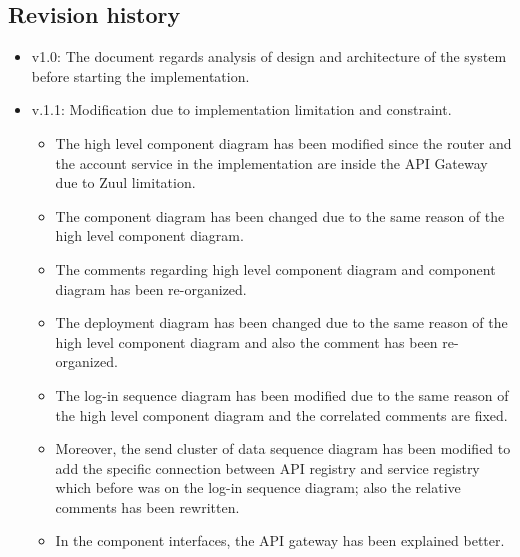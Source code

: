 \subsection{Revision history}
\begin{itemize}
\item v1.0: The document regards analysis of design and architecture of the system before starting the implementation.
\item v.1.1: Modification due to implementation limitation and constraint.
\begin{itemize}
	\item The high level component diagram has been modified since the router and the account service in the implementation are inside the API Gateway due to Zuul limitation.
	\item The component diagram has been changed due to the same reason of the high level component diagram.
	\item The comments regarding high level component diagram and component diagram has been re-organized.
	\item The deployment diagram has been changed due to the same reason of the high level component diagram and also the comment has been re-organized. 
	\item The log-in sequence diagram has been modified due to the same reason of the high level component diagram and the correlated comments are fixed. 
	\item Moreover, the send cluster of data sequence diagram has been modified to add the specific connection between API registry and service registry which before was on the log-in sequence diagram; also the relative comments has been rewritten.
	\item In the component interfaces, the API gateway has been explained better.
\end{itemize}
\end{itemize}
